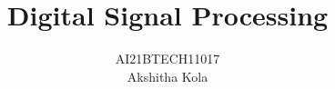 \documentclass[journal,12pt,twocolumn]{IEEEtran}
\renewcommand\thesection{\arabic{section}}
\begin{document}
\makeatletter
\def\pld@CF@loop#1+{%
    \ifx\relax#1\else
        \begingroup
          \pld@AccuSetX11%
          \def\pld@frac{{}{}}\let\pld@symbols\@empty\let\pld@vars\@empty
          \pld@false
          #1%
          \let\pld@temp\@empty
          \pld@AccuIfOne{}{\pld@AccuGet\pld@temp
                            \edef\pld@temp{\noexpand\pld@R\pld@temp}}%
           \pld@if \pld@Extend\pld@temp{\expandafter\pld@F\pld@frac}\fi
           \expandafter\pld@CF@loop@\pld@symbols\relax\@empty
           \expandafter\pld@CF@loop@\pld@vars\relax\@empty
           \ifx\@empty\pld@temp
               \def\pld@temp{\pld@R11}%
           \fi
          \global\let\@gtempa\pld@temp
        \endgroup
        \ifx\@empty\@gtempa\else
            \pld@ExtendPoly\pld@tempoly\@gtempa
        \fi
        \expandafter\pld@CF@loop
    \fi}
\def\pld@CMAddToTempoly{%
    \pld@AccuGet\pld@temp\edef\pld@temp{\noexpand\pld@R\pld@temp}%
    \pld@CondenseMonomials\pld@false\pld@symbols
    \ifx\pld@symbols\@empty \else
        \pld@ExtendPoly\pld@temp\pld@symbols
    \fi
    \ifx\pld@temp\@empty \else
        \pld@if
            \expandafter\pld@IfSum\expandafter{\pld@temp}%
               {\expandafter\def\expandafter\pld@temp\expandafter
                    {\expandafter\pld@F\expandafter{\pld@temp}{}}}%
                {}%
        \fi
        \pld@ExtendPoly\pld@tempoly\pld@temp
        \pld@Extend\pld@tempoly{\pld@monom}%
    \fi}            
\makeatother
\lstset{
language=Python,
frame=single, 
breaklines=true,
columns=fullflexible
}
\let\StandardTheFigure\thefigure
\renewcommand{\thefigure}{\theproblem}
\def\putbox#1#2#3{\makebox[0in][l]{\makebox[#1][l]{}\raisebox{\baselineskip}[0in][0in]{\raisebox{#2}[0in][0in]{#3}}}}
     \def\rightbox#1{\makebox[0in][r]{#1}}
     \def\centbox#1{\makebox[0in]{#1}}
     \def\topbox#1{\raisebox{-\baselineskip}[0in][0in]{#1}}
     \def\midbox#1{\raisebox{-0.5\baselineskip}[0in][0in]{#1}}
\vspace{3cm}
\title{ 
Digital Signal Processing
}
\author{AI21BTECH11017 \\ Akshitha Kola} 
\maketitle
\tableofcontents
\renewcommand{\thefigure}{\theenumi}
\renewcommand{\thetable}{\theenumi}
\renewcommand{\vec}{\textbf}
\bigskip
\end{document}

